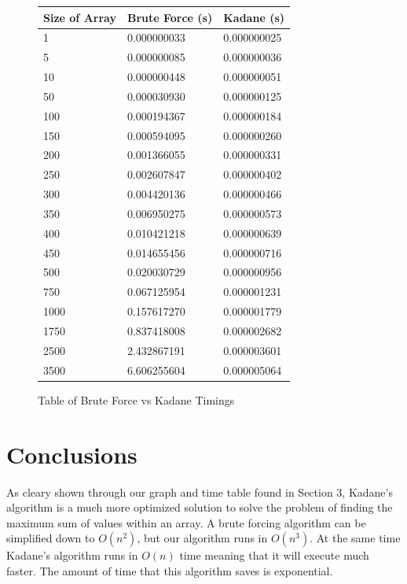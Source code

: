 \documentclass[10pt, letterpaper]{article}
\begin{document}
	\begin{figure}[!htb]
	\begin{center}
	\caption{
		\label{fig:time-table} Table of Brute Force vs Kadane Timings
	}
	\medskip
	\begin{tabular}{ | p{2cm} | l | l | }
			\hline
			Size of Array & Brute Force (s) & Kadane (s) \\ \hline
			1 & 0.000000033 & 0.000000025 \\ \hline
			5 & 0.000000085 & 0.000000036 \\ \hline
			10 & 0.000000448 & 0.000000051 \\ \hline
			50 & 0.000030930 & 0.000000125 \\ \hline
			100 & 0.000194367 & 0.000000184 \\ \hline
			150 & 0.000594095 & 0.000000260 \\ \hline
			200 & 0.001366055 & 0.000000331 \\ \hline
			250 & 0.002607847 & 0.000000402 \\ \hline
			300 & 0.004420136 & 0.000000466 \\ \hline
			350 & 0.006950275 & 0.000000573 \\ \hline
			400 & 0.010421218 & 0.000000639 \\ \hline
			450 & 0.014655456 & 0.000000716 \\ \hline
			500 & 0.020030729 & 0.000000956 \\ \hline
			750 & 0.067125954 & 0.000001231 \\ \hline
			1000 & 0.157617270 & 0.000001779 \\ \hline
			1750 & 0.837418008 & 0.000002682 \\ \hline
			2500 & 2.432867191 & 0.000003601 \\ \hline
			3500 & 6.606255604 & 0.000005064 \\ \hline
		\end{tabular}
	\end{center}
\end{figure}
	\section{Conclusions}
	As cleary shown through our graph and time table found in Section 3,
	Kadane's algorithm is a much more optimized solution to solve the problem of finding the maximum sum of values within an array. 
	A brute forcing algorithm can be simplified down to $O(n^2)$, but our algorithm runs in $O(n^3)$.
	At the same time Kadane's algorithm runs in $O(n)$ time meaning that it will execute much faster.
	The amount of time that this algorithm saves is exponential.
	
\end{document}
